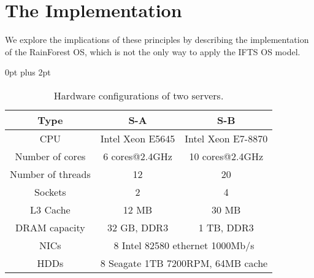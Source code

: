 \documentclass[pageno]{jpaper}
\begin{document}
\section{The Implementation}\label{implementation}
We explore the implications of these principles by describing the implementation of the RainForest OS, which is not the only way to apply the IFTS OS model.

















































\begin{table}[t]
\renewcommand{\arraystretch}{1.1}
\setlength{\abovecaptionskip}{3pt}
\setlength{\belowcaptionskip}{0pt}
\setlength{\textfloatsep} {0pt plus 2pt}
\setlength{\tabcolsep}{5pt}
\centering
\caption{Hardware configurations of two servers.}
\label{table_server_config}
\begin{lrbox}{\tablebox}
\begin{tabular}{|c|c|c|}
\hline
Type & S-A & S-B \\ \hline
CPU & Intel Xeon E5645 & Intel Xeon E7-8870 \\ \hline
Number of cores & 6 cores@2.4GHz & 10 cores@2.4GHz \\ \hline
Number of threads & 12 & 20 \\ \hline
Sockets & 2 & 4 \\ \hline
L3 Cache & 12 MB & 30 MB \\ \hline
DRAM capacity & 32 GB, DDR3 & 1 TB, DDR3\\ \hline
NICs & \multicolumn{2}{c|}{8 Intel 82580 ethernet 1000Mb/s} \\ \hline
HDDs & \multicolumn{2}{c|}{8 Seagate 1TB 7200RPM, 64MB cache} \\ \hline
\end{tabular}
\end{lrbox}
\scalebox{0.8}{\usebox{\tablebox}}
\end{table}
\end{document}
